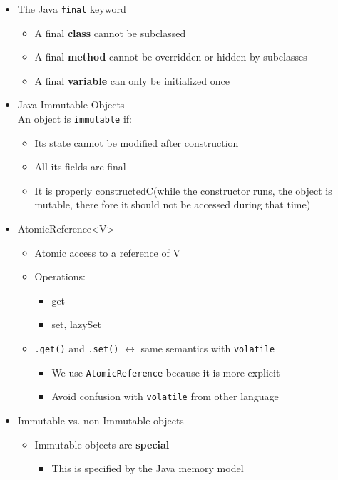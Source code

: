 \documentclass[a4paper]{article}
\newcommand{\inline}[1]{\lstinline!#1!}%
\begin{document}
\begin{itemize}
\begin{itemize}
			\end{itemize}
		\item The Java \inline{final} keyword
			\begin{itemize}
				\item A final \textbf{class} cannot be subclassed
				\item A final \textbf{method} cannot be overridden or hidden by subclasses
				\item A final \textbf{variable} can only be initialized once
			\end{itemize}
		\item Java Immutable Objects
		\\An object is \inline{immutable} if:
			\begin{itemize}
				\item Its state cannot be modified after construction
				\item All its fields are final
				\item It is properly constructedC(while the constructor runs, the object is mutable, there fore it should not be accessed during that time)
			\end{itemize}
		\item AtomicReference<V>
			\begin{itemize}
				\item Atomic access to a reference of V
				\item Operations:
					\begin{itemize}
						\item get
						\item set, lazySet
					\end{itemize}
				\item \inline{.get()} and \inline{.set()} $\leftrightarrow$ same semantics with \inline{volatile}
					\begin{itemize}
						\item We use \inline{AtomicReference} because it is more explicit
						\item Avoid confusion with \inline{volatile} from other language
					\end{itemize}
			\end{itemize}
		\item Immutable vs. non-Immutable objects
			\begin{itemize}
				\item Immutable objects are \textbf{special}
					\begin{itemize}
						\item This is specified by the Java memory model

\end{itemize}
\end{itemize}
\end{itemize}
\end{document}
